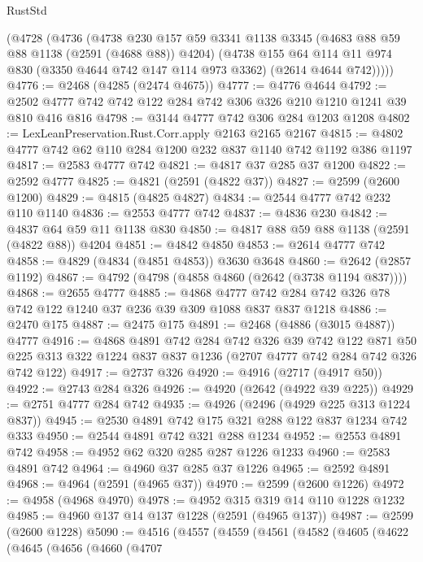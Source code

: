 \begin{lexlean}{RustStd}
\begin{coremodule}
    (@4728
      (@4736
        (@4738
          @230
          @157
          @59
          @3341
          @1138
          @3345
          (@4683 @88 @59 @88 @1138 (@2591 (@4688 @88)) @4204)
          (@4738
            @155
            @64
            @114
            @11
            @974
            @830
            (@3350 @4644 @742 @147 @114 @973 @3362)
            (@2614 @4644 @742)))))
@4776 := @2468 (@4285 (@2474 @4675))
@4777 := @4776 @4644
@4792 := @2502 @4777 @742 @742 @122 @284 @742 @306 @326 @210 @1210 @1241 @39 @810 @416 @816
@4798 := @3144 @4777 @742 @306 @284 @1203 @1208
@4802 := LexLeanPreservation.Rust.Corr.apply @2163 @2165 @2167
@4815 := @4802 @4777 @742 @62 @110 @284 @1200 @232 @837 @1140 @742 @1192 @386 @1197
@4817 := @2583 @4777 @742
@4821 := @4817 @37 @285 @37 @1200
@4822 := @2592 @4777
@4825 := @4821 (@2591 (@4822 @37))
@4827 := @2599 (@2600 @1200)
@4829 := @4815 (@4825 @4827)
@4834 := @2544 @4777 @742 @232 @110 @1140
@4836 := @2553 @4777 @742
@4837 := @4836 @230
@4842 := @4837 @64 @59 @11 @1138 @830
@4850 := @4817 @88 @59 @88 @1138 (@2591 (@4822 @88)) @4204
@4851 := @4842 @4850
@4853 := @2614 @4777 @742
@4858 := @4829 (@4834 (@4851 @4853)) @3630 @3648
@4860 := @2642 (@2857 @1192)
@4867 := @4792 (@4798 (@4858 @4860 (@2642 (@3738 @1194 @837))))
@4868 := @2655 @4777
@4885 := @4868 @4777 @742 @284 @742 @326 @78 @742 @122 @1240 @37 @236 @39 @309 @1088 @837 @837 @1218
@4886 := @2470 @175
@4887 := @2475 @175
@4891 := @2468 (@4886 (@3015 @4887)) @4777
@4916 := @4868
    @4891
    @742
    @284
    @742
    @326
    @39
    @742
    @122
    @871
    @50
    @225
    @313
    @322
    @1224
    @837
    @837
    @1236
    (@2707 @4777 @742 @284 @742 @326 @742 @122)
@4917 := @2737 @326
@4920 := @4916 (@2717 (@4917 @50))
@4922 := @2743 @284 @326
@4926 := @4920 (@2642 (@4922 @39 @225))
@4929 := @2751 @4777 @284 @742
@4935 := @4926 (@2496 (@4929 @225 @313 @1224 @837))
@4945 := @2530 @4891 @742 @175 @321 @288 @122 @837 @1234 @742 @333
@4950 := @2544 @4891 @742 @321 @288 @1234
@4952 := @2553 @4891 @742
@4958 := @4952 @62 @320 @285 @287 @1226 @1233
@4960 := @2583 @4891 @742
@4964 := @4960 @37 @285 @37 @1226
@4965 := @2592 @4891
@4968 := @4964 (@2591 (@4965 @37))
@4970 := @2599 (@2600 @1226)
@4972 := @4958 (@4968 @4970)
@4978 := @4952 @315 @319 @14 @110 @1228 @1232
@4985 := @4960 @137 @14 @137 @1228 (@2591 (@4965 @137))
@4987 := @2599 (@2600 @1228)
@5090 := @4516
    (@4557
      (@4559
        (@4561
          (@4582
            (@4605
              (@4622
                (@4645
                  (@4656
                    (@4660
                      (@4707

\end{coremodule}
\end{lexlean}

